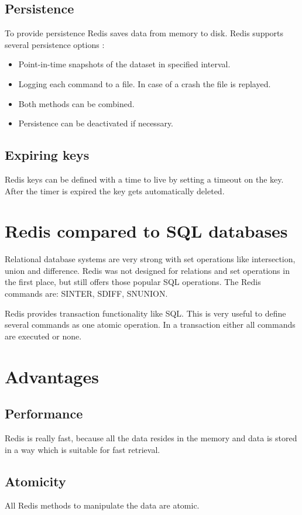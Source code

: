 \subsection{Persistence}
To provide persistence Redis saves data from memory to disk. Redis supports
several persistence options \cite{persistenceredis}:
\begin{itemize}
    \item Point-in-time snapshots of the dataset in specified interval.
    \item Logging each command to a file. In case of a crash the file is
    replayed.
    \item Both methods can be combined.
    \item Persistence can be deactivated if necessary.
\end{itemize}

\subsection{Expiring keys}
Redis keys can be defined with a time to live by setting a timeout on the key.
After the timer is expired the key gets automatically deleted.

\section{Redis compared to SQL databases}
Relational database systems are very strong with set operations like
intersection, union and difference. Redis was not designed for relations and set
operations in the first place, but still offers those popular SQL operations.
The Redis commands are: SINTER, SDIFF, SNUNION.

Redis provides transaction functionality like SQL. This is very useful to define
several commands as one atomic operation. In a transaction either all commands
are executed or none.

\section{Advantages}
\subsection{Performance}
Redis is really fast, because all the data resides in the memory and data is
stored in a way which is suitable for fast retrieval.

\subsection{Atomicity}
All Redis methods to manipulate the data are atomic.

